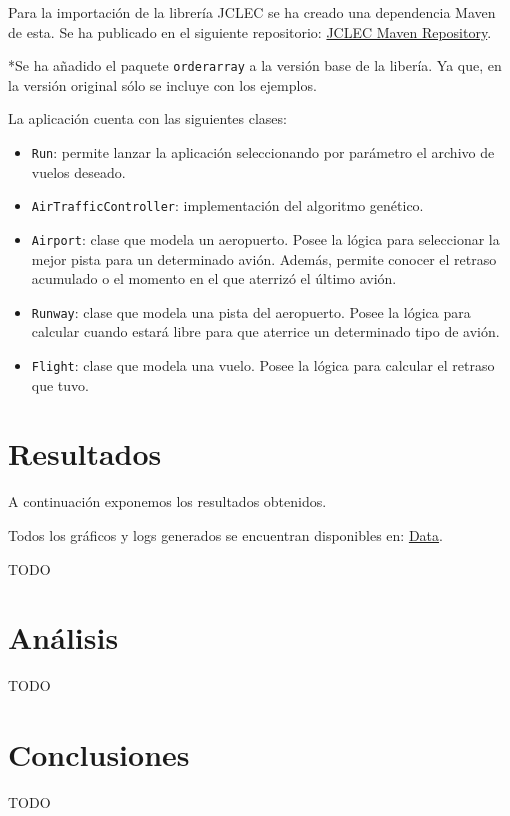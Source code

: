 \documentclass[a4paper,12pt,titlepage]{article}
\begin{document}
Para la importación de la librería JCLEC se ha creado una dependencia Maven de esta. Se ha publicado en el siguiente repositorio: \href{https://github.com/davidmigloz/jclec\_maven\_repo}{JCLEC Maven Repository}. 

*Se ha añadido el paquete \lstinline|orderarray| a la versión base de la libería. Ya que, en la versión original sólo se incluye con los ejemplos.

La aplicación cuenta con las siguientes clases:

\begin{itemize}[noitemsep]
	\item \lstinline|Run|: permite lanzar la aplicación seleccionando por parámetro el archivo de vuelos deseado.
	\item \lstinline|AirTrafficController|: implementación del algoritmo genético.
	\item \lstinline|Airport|: clase que modela un aeropuerto. Posee la lógica para seleccionar la mejor pista para un determinado avión. Además, permite conocer el retraso acumulado o el momento en el que aterrizó el último avión.
	\item \lstinline|Runway|: clase que modela una pista del aeropuerto. Posee la lógica para calcular cuando estará libre para que aterrice un determinado tipo de avión.
	\item \lstinline|Flight|: clase que modela una vuelo. Posee la lógica para calcular el retraso que tuvo.
\end{itemize}


\section{Resultados}

A continuación exponemos los resultados obtenidos.

Todos los gráficos y logs generados se encuentran disponibles en: \href{https://github.com/davidmigloz/evolutionary-computation/tree/master/P1\_AirTafficController/data}{Data}.

TODO

\section{Análisis}

TODO
	 
\section{Conclusiones}

TODO

\newpage


\end{document}
